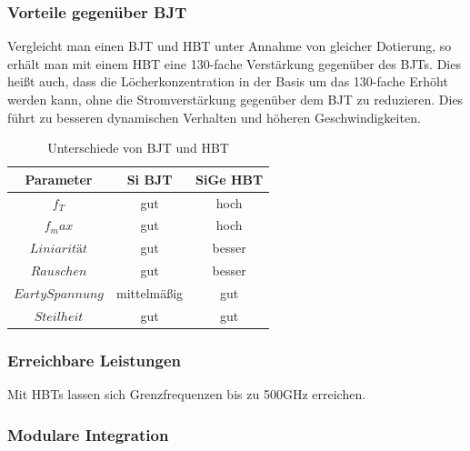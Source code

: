 	\subsubsection{Vorteile gegenüber BJT}
	Vergleicht man einen BJT und HBT unter Annahme von gleicher Dotierung, so erhält man mit einem HBT eine 130-fache Verstärkung gegenüber des BJTs. Dies heißt auch, dass die Löcherkonzentration in der Basis um das 130-fache Erhöht werden kann, ohne die Stromverstärkung gegenüber dem BJT zu reduzieren. Dies führt zu besseren dynamischen Verhalten und höheren Geschwindigkeiten.
	
	\begin{table}
		\centering
		\begin{tabular}{c|c|c}
			Parameter & Si BJT & SiGe HBT\\
			\hline
			$f_T$ & gut & hoch \\
			$f_max$ & gut & hoch \\
			$Liniarität$ & gut & besser \\
			$Rauschen$ & gut & besser \\
			$Earty Spannung$ & mittelmäßig & gut \\
			$Steilheit$ & gut & gut \\
		\end{tabular}
		\caption{Unterschiede von BJT und HBT}
	\end{table}
	
	\subsubsection{Erreichbare Leistungen}
	Mit HBTs lassen sich Grenzfrequenzen bis zu 500GHz erreichen.
	\subsubsection{Modulare Integration}


